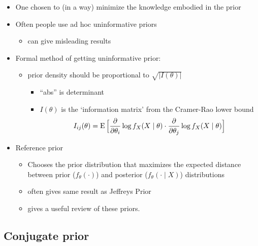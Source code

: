 \begin{itemize}[leftmargin=0pt]
\item One chosen to (in a way) minimize the knowledge embodied in
       the prior
\item Often people use ad hoc uninformative priors
\begin{itemize}
\item can give misleading results
\end{itemize}
\item Formal method of getting uninformative prior:
\begin{itemize}
\item prior density should be proportional to $\sqrt{|I(\theta)|}$
\begin{itemize}
\item ``abs'' is determinant
\item $I(\theta)$ is the `information matrix' from the Cramer-Rao lower bound
  \[I_{ij}(\theta) = \operatorname{E}\Big[ \frac{\partial}{\partial \theta_i} \log f_X(X \mid \theta) \cdot \frac{\partial}{\partial \theta_j}
  \log f_X(X \mid \theta) \Big]\]
\end{itemize}
\end{itemize}
\item Reference prior
\begin{itemize}
\item Chooses the prior distribution that maximizes the expected
  distance between prior ($f_\theta(\cdot)$) and posterior ($f_\theta(\cdot \mid X)$)
  distributions
\item often gives same result as Jeffreys Prior
\item \citet{Ber05} gives a useful review of these priors.
\end{itemize}
\end{itemize}

\subsection{Conjugate prior}

